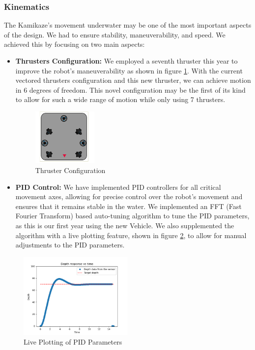 \subsubsection{Kinematics}
The Kamikaze's movement underwater may be one of the most important aspects of
the design. We had to ensure stability, maneuverability, and speed. We achieved
this by focusing on two main aspects:
\begin{itemize}
        
    \item \textbf{Thrusters Configuration:} We employed a seventh thruster this year to
        improve the robot's maneuverability as shown in figure \ref{fig:thruster}. With the current vectored thrusters
        configuration and this new thruster, we can achieve motion in 6 degrees of freedom.
        This novel configuration may be the first of its kind to allow for such a wide range of motion while only using 7 thrusters.
        \begin{figure}[h]
            \centering
            \includegraphics[width=0.3\textwidth]{Sections/3Design&Manufacturing/tex/Software/images/Thrusters.png}
            \caption{Thruster Configuration}
            \label{fig:thruster}
        \end{figure}

        \item \textbf{PID Control:} We have implemented PID controllers for all critical movement axes, allowing for
        precise control over the robot's movement and ensures that it remains stable in the water. We implemented an FFT (Fast Fourier Transform)
        based auto-tuning algorithm to tune the PID parameters, as this is our first year using the new Vehicle. We also supplemented the algorithm with a live
        plotting feature, shown in figure \ref{fig:pid_live},
         to allow for manual adjustments to the PID parameters.
\end{itemize}
\begin{figure}[h]
    \centering
    \includegraphics[width=0.5\textwidth]{Sections/3Design&Manufacturing/tex/Software/images/Pid.png}
    \caption{Live Plotting of PID Parameters}
    \label{fig:pid_live}
\end{figure}

